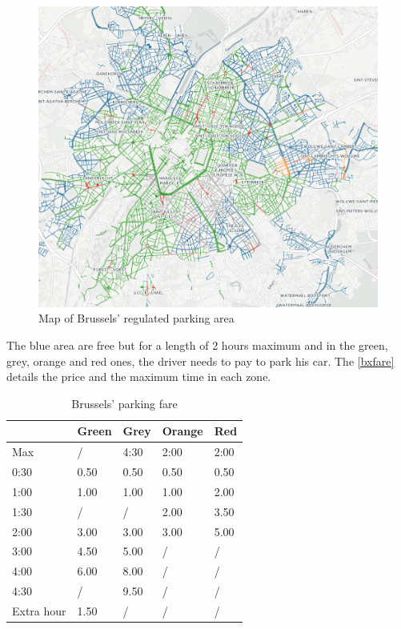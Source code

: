 \documentclass[12pt,a4paper,oneside]{book}
\begin{document}
\begin{figure}[h]
\centering
\caption{Map of Brussels' regulated parking area}
\label{bxmap}
\includegraphics[keepaspectratio=true,width=\textwidth-2cm]{images/bxpark.png}
\end{figure}


The blue area are free but for a length of 2 hours maximum and in the green, grey, orange and red ones, the driver needs to pay to park his car. The \autoref{bxfare} details the price and the maximum time in each zone.\\

\begin{table}[h]
\centering
\caption{Brussels' parking fare}
\label{bxfare}
\begin{tabular}{|l|l|l|l|l|}
\hline
           & Green & Grey & Orange & Red  \\ \hline
Max        & /     & 4:30 & 2:00   & 2:00 \\ \hline
0:30       & 0.50  & 0.50 & 0.50   & 0.50 \\ \hline
1:00       & 1.00  & 1.00 & 1.00   & 2.00 \\ \hline
1:30       & /     & /    & 2.00   & 3.50 \\ \hline
2:00       & 3.00  & 3.00 & 3.00   & 5.00 \\ \hline
3:00       & 4.50  & 5.00 & /      & /    \\ \hline
4:00       & 6.00  & 8.00 & /      & /    \\ \hline
4:30       & /     & 9.50 & /      & /    \\ \hline
Extra hour & 1.50  & /    & /      & /    \\ \hline
\end{tabular}
\end{table}
\end{document}
